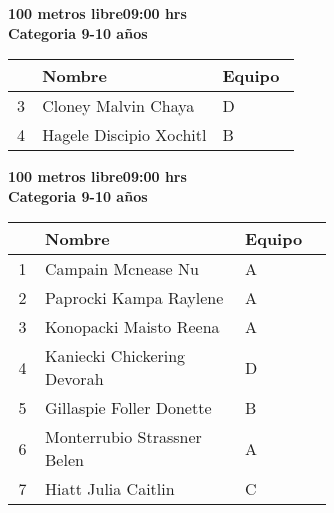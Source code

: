 \begin{minipage}{0.95\linewidth}\vspace{0.5cm} 
\begin{flushleft}
\textbf{
\hspace{-0.15cm}100 metros libre\hspace{1.5cm}09:00 hrs \\Categoria 9-10 años}\vspace{-0.2cm} 
\end{flushleft}
\begin{tabular}{cp{0.63\linewidth}l}
\hline
& \textbf{Nombre} & \textbf{Equipo} \\ \hline
3 & Cloney Malvin Chaya & D \\ 
4 & Hagele Discipio Xochitl & B \\ 
\end{tabular}
\end{minipage}
\begin{minipage}{0.95\linewidth}\vspace{0.5cm} 
\begin{flushleft}
\textbf{
\hspace{-0.15cm}100 metros libre\hspace{1.5cm}09:00 hrs \\Categoria 9-10 años}\vspace{-0.2cm} 
\end{flushleft}
\begin{tabular}{cp{0.63\linewidth}l}
\hline
& \textbf{Nombre} & \textbf{Equipo} \\ \hline
1 & Campain Mcnease Nu & A \\ 
2 & Paprocki Kampa Raylene & A \\ 
3 & Konopacki Maisto Reena & A \\ 
4 & Kaniecki Chickering Devorah & D \\ 
5 & Gillaspie Foller Donette & B \\ 
6 & Monterrubio Strassner Belen & A \\ 
7 & Hiatt Julia Caitlin & C \\ 
\end{tabular}
\end{minipage}
